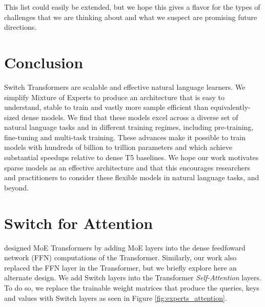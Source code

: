 \documentclass[twoside,11pt]{article}
\begin{document}
This list could easily be extended, but we hope this gives a flavor for the types of challenges that we are thinking about and what we suspect are promising future directions.

\section{Conclusion}
Switch Transformers are scalable and effective natural language learners.
We simplify Mixture of Experts to produce an architecture that is easy to understand, stable to train and vastly more sample efficient than equivalently-sized dense models.
We find that these models excel across a diverse set of natural language tasks and in different training regimes, including pre-training, fine-tuning and multi-task training.
These advances make it possible to train models with hundreds of billion to trillion parameters and which achieve substantial speedups relative to dense T5 baselines.
We hope our work motivates sparse models as an effective architecture and that this encourages researchers and practitioners to consider these flexible models in natural language tasks, and beyond.


\appendix

\section{Switch for Attention} \label{app: expert_attention}
\citet{shazeer2018mesh,lepikhin2020gshard} designed MoE Transformers \citep{shazeer2017outrageously} by adding MoE layers into the dense feedfoward network (FFN) computations of the Transformer.
Similarly, our work also replaced the FFN layer in the Transformer, but we briefly explore here an alternate design.
We add Switch layers into the Transformer \emph{Self-Attention} layers.
To do so, we replace the trainable weight matrices that produce the queries, keys and values with Switch layers as seen in Figure \ref{fig:experts_attention}.
\end{document}
